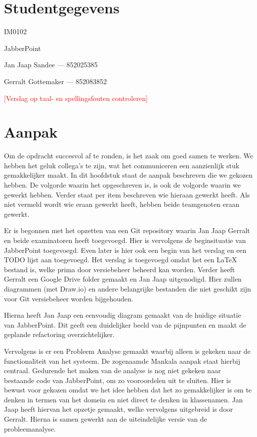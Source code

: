 \documentclass[a4paper]{article}
\newcommand{\todo}[1]{\textcolor{red}{[#1]}}
\begin{document}
\pagestyle{fancy}

\section*{Studentgegevens}
\begin{description}
	\item [Cursuscode] IM0102
	\item JabberPoint
    \item Jan Jaap Sandee --- 852025385
	\item Gerralt Gottemaker --- 852083852
\end{description}
\todo{Verslag op taal- en spellingsfouten controleren}

\section*{Aanpak}
Om de opdracht succesvol af te ronden, is het zaak om goed samen te werken. We hebben het geluk collega's te zijn, wat het communiceren een aanzienlijk stuk gemakkelijker maakt. In dit hoofdstuk staat de aanpak beschreven die we gekozen hebben. De volgorde waarin het opgeschreven is, is ook de volgorde waarin we gewerkt hebben. Verder staat per item beschreven wie hieraan gewerkt heeft. Als niet vermeld wordt wie eraan gewerkt heeft, hebben beide teamgenoten eraan gewerkt.

Er is begonnen met het opzetten van een Git repository waarin Jan Jaap Gerralt en beide examinatoren heeft toegevoegd. Hier is vervolgens de beginsituatie van JabberPoint toegevoegd. Even later is hier ook een begin van het verslag en een TODO lijst aan toegevoegd. Het verslag is toegevoegd omdat het een LaTeX bestand is, welke prima door versiebeheer beheerd kan worden. Verder heeft Gerralt een Google Drive folder gemaakt en Jan Jaap uitgenodigd. Hier zullen diagrammen (met Draw.io) en andere belangrijke bestanden die niet geschikt zijn voor Git versiebeheer worden bijgehouden.

Hierna heeft Jan Jaap een eenvoudig diagram gemaakt van de huidige situatie van JabberPoint. Dit geeft een duidelijker beeld van de pijnpunten en maakt de geplande refactoring overzichtelijker.

Vervolgens is er een Probleem Analyse gemaakt waarbij alleen is gekeken naar de functionaliteit van het systeem. De zogenaamde Mankala aanpak staat hierbij centraal. Gedurende het maken van de analyse is nog niet gekeken naar bestaande code van JabberPoint, om zo vooroordelen uit te sluiten. Hier is bewust voor gekozen omdat we het idee hebben dat het zo gemakkelijker is om te denken in termen van het domein en niet direct te denken in klassenamen. Jan Jaap heeft hiervan het opzetje gemaakt, welke vervolgens uitgebreid is door Gerralt. Hierna is samen gewerkt aan de uiteindelijke versie van de probleemanalyse.
\end{document}
